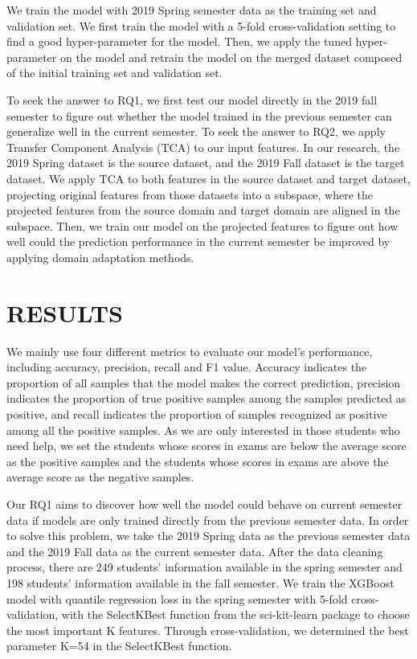 \documentclass[sigconf,final]{acmart}
\begin{document}
We train the model with 2019 Spring semester data as the training set and validation set. We first train the model with a 5-fold cross-validation setting to find a good hyper-parameter for the model. Then, we apply the tuned hyper-parameter on the model and retrain the model on the merged dataset composed of the initial training set and validation set. 

To seek the answer to RQ1, we first test our model directly in the 2019 fall semester to figure out whether the model trained in the previous semester can generalize well in the current semester. To seek the answer to RQ2, we apply Transfer Component Analysis (TCA) to our input features. In our research, the 2019 Spring dataset is the source dataset, and the 2019 Fall dataset is the target dataset. We apply TCA to both features in the source dataset and target dataset, projecting original features from those datasets into a subspace, where the projected features from the source domain and target domain are aligned in the subspace. Then, we train our model on the projected features to figure out how well could the prediction performance in the current semester be improved by applying domain adaptation methods.




\section{RESULTS}
We mainly use four different metrics to evaluate our model’s performance, including accuracy, precision, recall and F1 value. Accuracy indicates the proportion of all samples that the model makes the correct prediction, precision indicates the proportion of true positive samples among the samples predicted as positive, and recall indicates the proportion of samples recognized as positive among all the positive samples. As we are only interested in those students who need help, we set the students whose scores in exams are below the average score as the positive samples and the students whose scores in exams are above the average score as the negative samples.

Our RQ1 aims to discover how well the model could behave on current semester data if models are only trained directly from the previous semester data. In order to solve this problem, we take the 2019 Spring data as the previous semester data and the 2019 Fall data as the current semester data. After the data cleaning process, there are 249 students’ information available in the spring semester and 198 students’ information available in the fall semester. We train the XGBoost model with quantile regression loss in the spring semester with 5-fold cross-validation, with the SelectKBest function from the sci-kit-learn package to choose the most important K features. Through cross-validation, we determined the best parameter K=54 in the SelectKBest function. 
\end{document}
